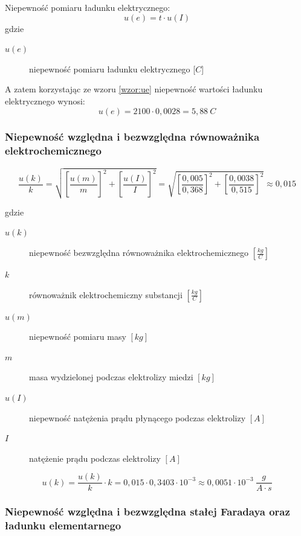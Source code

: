\documentclass[a4paper,11pt]{article}
\begin{document}
Niepewność pomiaru ładunku elektrycznego:
\begin{equation}
\label{wzor:ue}
u(e) = t \cdot u(I)
\end{equation}
gdzie 
\begin{description}
\item [$u(e)$] niepewność pomiaru ładunku elektrycznego [$C$]
\end{description}

A zatem korzystając ze wzoru {\ref{wzor:ue}} niepewność wartości ładunku elektrycznego wynosi:
$$
u(e) = 2100 \cdot 0,0028 = 5,88 ~C
$$

\subsubsection*{Niepewność względna i bezwzględna  równoważnika elektrochemicznego}  

$$
\frac{u(k)}{k} = \sqrt{\left[\frac{u(m)}{m} \right]^2 + \left[\frac{u(I)}{I} \right]^2 } = \sqrt{\left[\frac{ 0,005}{0,368} \right]^2 + \left[\frac{0,0038}{0,515} \right]^2 } \approx 0,015
$$

gdzie
\begin{description}
\item [$u(k)$] niepewność bezwzględna równoważnika elektrochemicznego $\left[\frac{kg}{C}\right]$
\item [$k$] równoważnik elektrochemiczny substancji $\left [\frac{kg}{C}\right] $
\item [$u(m)$] niepewność pomiaru masy $[kg]$
\item [$m$] masa wydzielonej podczas elektrolizy miedzi $[kg]$
\item [$u(I)$] niepewność natężenia prądu płynącego podczas elektrolizy $[A]$
\item [$I$] natężenie prądu podczas elektrolizy $[A]$
\end{description}
$$
u(k) = \frac{u(k)}{k} \cdot k =  0,015 \cdot 0,3403 \cdot 10^{-3} \approx 0,0051 \cdot 10^{-3} ~ \frac{g}{A \cdot s}
$$

\subsubsection*{Niepewność względna i bezwzględna  stałej Faradaya oraz ładunku elementarnego}
\end{document}

